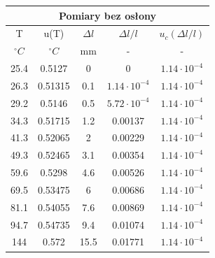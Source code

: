 \begin{center}
    \begin{tabular}{|c|c||c|c|c|}
        \hline
        \multicolumn{5}{|c|}{Pomiary bez osłony} \\
        \hline
        T     & u(T)    & $\Delta l$ & $\Delta l / l$  & $u_c(\Delta l / l)$ \\ \hline
        $^{\circ}C$ & $^{\circ}C$   & mm      & -          & -          \\ \hline
        25.4  & 0.5127  & 0       & 0          & $1.14 \cdot 10^{-4}$ \\ \hline
        26.3  & 0.51315 & 0.1     & $1.14 \cdot 10^{-4}$ & $1.14 \cdot 10^{-4}$ \\ \hline
        29.2  & 0.5146  & 0.5     & $5.72 \cdot 10^{-4}$ & $1.14 \cdot 10^{-4}$ \\ \hline
        34.3  & 0.51715 & 1.2     & 0.00137    & $1.14 \cdot 10^{-4}$ \\ \hline
        41.3  & 0.52065 & 2       & 0.00229    & $1.14 \cdot 10^{-4}$ \\ \hline
        49.3  & 0.52465 & 3.1     & 0.00354    & $1.14 \cdot 10^{-4}$ \\ \hline
        59.6  & 0.5298  & 4.6     & 0.00526    & $1.14 \cdot 10^{-4}$ \\ \hline
        69.5  & 0.53475 & 6       & 0.00686    & $1.14 \cdot 10^{-4}$ \\ \hline
        81.1  & 0.54055 & 7.6     & 0.00869    & $1.14 \cdot 10^{-4}$ \\ \hline
        94.7  & 0.54735 & 9.4     & 0.01074    & $1.14 \cdot 10^{-4}$ \\ \hline
        144   & 0.572   & 15.5    & 0.01771    & $1.14 \cdot 10^{-4}$ \\ \hline
    \end{tabular}
\end{center}

